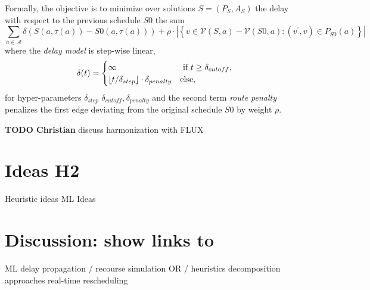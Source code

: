 \documentclass{article}
\DeclarePairedDelimiter{\floor}{\lfloor}{\rfloor}
\begin{document}
Formally, the objective is to minimize over solutions $S=(P_S,A_S)$ the delay with respect to the previous schedule $S0$ the sum
\begin{equation}
\sum_{a \in \mathcal{A}} \delta\left(S(a,\tau(a)) - S0(a,\tau(a))\right) + \rho \cdot \left|\left\{v \in \mathcal{V}(S,a)-\mathcal{V}(S0,a): (v^\prime,v) \in P_{S0}(a) \right\}\right|
\end{equation}
where the \emph{delay model} is step-wise linear,
\begin{equation}
\delta(t) =
\begin{cases}
    \infty & \textrm{ if } t \geq \delta_{cutoff},\\
    \floor{t / \delta_{step}} \cdot \delta_{penalty}  & \textrm{else},
\end{cases}
\end{equation}
for hyper-parameters $\delta_{step}$ $\delta_{cutoff}, \delta_{penalty}$
and the second term \emph{route penalty} penalizes the first edge deviating from the original schedule $S0$ by weight  $\rho$.


\begin{mdframed}
{\bf TODO Christian} discuss harmonization with FLUX
\end{mdframed}


\section{Ideas H2}
        Heuristic ideas
        ML Ideas

\section{Discussion: show links to}
        ML
        delay propagation / recourse
        simulation
        OR / heuristics
        decomposition approaches
        real-time rescheduling


\end{document}
